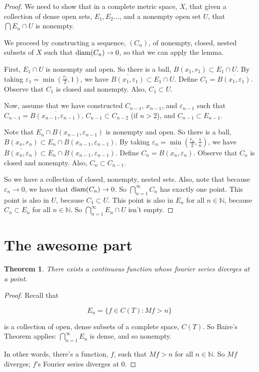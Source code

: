 \documentclass{amsart}
\newcommand{\vep}{\varepsilon}
\newcommand{\N}{\mathbb{N}}
\newcommand{\diam}{\text{\rm diam}}
\newtheorem{thm}{Theorem}[section]
\theoremstyle{definition}
\begin{document}
\begin{proof}
We need to show that in a complete metric space, $X$, that given a collection of dense open sets, $E_1, E_2 \ldots$, and a nonempty open set $U$, that $\bigcap E_n \cap U$ is nonempty.

We proceed by constructing a sequence, $(C_n)$, of nonempty, closed, nested subsets of $X$ such that $\diam(C_n) \to 0$, so that we can apply the lemma.

First, $E_1 \cap U$ is nonempty and open.
So there is a ball, $B(x_1,r_1) \subset E_1 \cap U$.
By taking $\vep_1 = \min(\frac{r_1}{2},1)$, we have $\overline{B(x_1,\vep_1)} \subset E_1 \cap U$.
Define $C_1 = \overline{B(x_1,\vep_1)}$.
Observe that $C_1$ is closed and nonempty. Also, $C_1 \subset U$.

Now, assume that we have constructed $C_{n-1}$, $x_{n-1}$, and $\vep_{n-1}$ such that $C_{n-1} = \overline{B(x_{n-1},\vep_{n-1})}$, $C_{n-1} \subset C_{n-2}$ (if $n >2$), and $C_{n-1} \subset E_{n-1}$.

Note that $E_n \cap B(x_{n-1},\vep_{n-1})$ is nonempty and open.
So there is a ball, $B(x_n,r_n) \subset E_n \cap B(x_{n-1},\vep_{n-1})$.
By taking $\vep_n = \min(\frac{r_n}{2},\frac{1}{n})$, we have $\overline{B(x_n,\vep_n)} \subset E_n \cap B(x_{n-1},\vep_{n-1})$.
Define $C_n = \overline{B(x_n,\vep_n)}$.
Observe that $C_n$ is closed and nonempty. Also, $C_n \subset C_{n-1}$.

So we have a collection of closed, nonempty, nested sets.
Also, note that because $\vep_n \to 0$, we have that $\diam(C_n) \to 0$. 
So $\bigcap\limits_{n=1}^\infty C_n$ has exactly one point.
This point is also in $U$, because $C_1 \subset U$.
This point is also in $E_n$ for all $n \in \N$, because $C_n \subset E_n$ for all $n \in \N$.
So $\bigcap\limits_{n=1}^\infty E_n \cap U$ isn't empty.

\end{proof}

\section{The awesome part}

\begin{thm}
There exists a continuous function whose fourier series diverges at a point.
\end{thm}

\begin{proof}

Recall that 

\begin{displaymath}
E_n = \{f \in C(T) : Mf > n\}
\end{displaymath}

is a collection of open, dense subsets of a complete space, $C(T)$. 
So Baire's Theorem applies: $\bigcap\limits_{n=1}^\infty E_n $ is dense, and so nonempty.

In other words, there's a function, $f$, such that $Mf >n$ for all $n \in \N$. 
So $Mf$ diverges; $f$'s Fourier series diverges at $0$. 

\end{proof}
\end{document}

